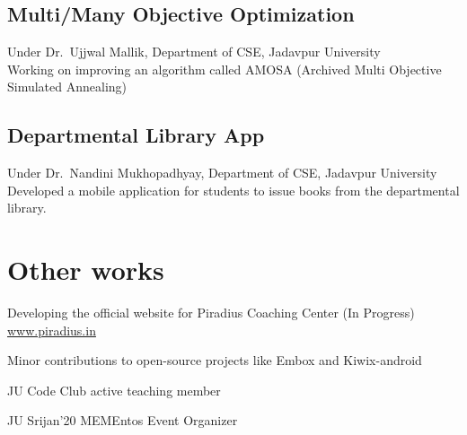 \documentclass[]{deedy-resume-openfont}
\begin{document}
\begin{minipage}[t]{0.55\textwidth}
\subsection{Multi/Many Objective Optimization}
Under Dr.\ Ujjwal Mallik, 
Department of CSE, Jadavpur University\\
Working on improving an algorithm called AMOSA
(Archived Multi Objective Simulated Annealing)
\sectionsep



\subsection{Departmental Library App}
Under Dr.\ Nandini Mukhopadhyay,
Department of CSE, Jadavpur University\\
Developed a mobile application for students to issue books from
the departmental library.
\sectionsep

\section{Other works} 
\sectionsep
\begin{tightemize}
\item Developing the official website for Piradius Coaching Center (In Progress)
\\\href{https:\\www.piradius.in}{www.piradius.in}
\item Minor contributions to open-source projects like Embox and Kiwix-android
\item JU Code Club active teaching member
\item JU Srijan'20 MEMEntos Event Organizer
\end{tightemize}


\end{minipage} 
\hfill
\end{document}
